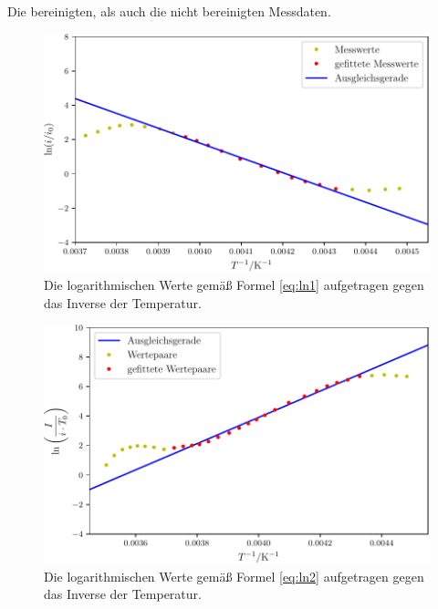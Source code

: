 \begin{table}
\caption{Die bereinigten, als auch die nicht bereinigten Messdaten.}
\begin{minipage}[t]{0.5\textwidth}
	\centering
	
\end{minipage}
\begin{minipage}[t]{0.65\textwidth}
	\centering
	
\end{minipage}
\label{tab:data1}
\end{table}

\begin{figure}
	\centering
	\includegraphics[width=\linewidth-60pt,height=\textheight-60pt,keepaspectratio]{content/images/W1_1.pdf}
	\caption{Die logarithmischen Werte gemäß Formel \eqref{eq:ln1} aufgetragen gegen das Inverse der Temperatur.}
	\label{fig:W1_1}
\end{figure}

\begin{figure}
	\centering
	\includegraphics[width=\linewidth-60pt,height=\textheight-60pt,keepaspectratio]{content/images/W1_2.pdf}
	\caption{Die logarithmischen Werte gemäß Formel \eqref{eq:ln2} aufgetragen gegen das Inverse der Temperatur.}
	\label{fig:W1_2}
\end{figure}

